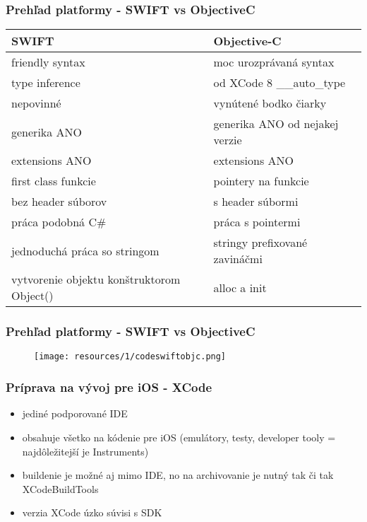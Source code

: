 \documentclass[serif,mathserif]{beamer}
\begin{document}
\begin{frame}
  \frametitle{Prehľad platformy - SWIFT vs ObjectiveC}
  \begin{tabularx}{\textwidth}{E{1} E{1}}
  SWIFT & Objective-C \\
  \hline\hline
  friendly syntax & moc urozprávaná syntax \\
  \hline
  type inference & od XCode 8 \_\_auto\_type \\
  \hline
  nepovinné & vynútené bodko čiarky \\
  \hline
  generika ANO & generika ANO od nejakej verzie \\
  \hline
  extensions ANO & extensions ANO \\
  \hline
  first class funkcie & pointery na funkcie \\
  \hline
  bez header súborov & s header súbormi \\
  \hline
  práca podobná C\# & práca s pointermi \\   
  \hline
  jednoduchá práca so stringom & stringy prefixované zavináčmi \\     
  \hline
  vytvorenie objektu konštruktorom Object() & alloc a init \\  
  \hline   
  \end{tabularx}
\end{frame}

\begin{frame}
  \frametitle{Prehľad platformy - SWIFT vs ObjectiveC}
  \begin{figure}[h]
	\texttt{[image: resources/1/codeswiftobjc.png]}
  \end{figure}
\end{frame}

\begin{frame}
  \frametitle{Príprava na vývoj pre iOS - XCode}
  \begin{itemize}
	\item jediné podporované IDE \pause
	\item obsahuje všetko na kódenie pre iOS (emulátory, testy, developer tooly = najdôležitejší je Instruments)\pause
	\item buildenie je možné aj mimo IDE, no na archivovanie je nutný tak či tak XCodeBuildTools \pause
	\item verzia XCode úzko súvisi s SDK
	\end{itemize}
\end{frame}
\end{document}
